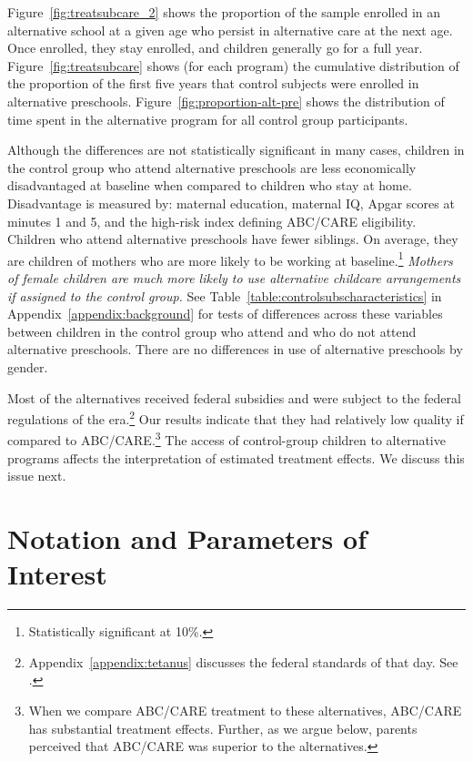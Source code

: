 Figure~\ref{fig:treatsubcare_2} shows the proportion of the sample enrolled in an alternative school at a given age who persist in alternative care at the next age. Once enrolled, they stay enrolled, and children generally go for a full year.  Figure~\ref{fig:treatsubcare} shows (for each program) the cumulative distribution of the proportion of the first five years that control subjects were enrolled in alternative preschools. Figure~\ref{fig:proportion-alt-pre} shows the distribution of time spent in the alternative program for all control group participants.

Although the differences are not statistically significant in many cases, children in the control group who attend alternative preschools are less economically disadvantaged at baseline when compared to children who stay at home. Disadvantage is measured by: maternal education, maternal IQ, Apgar scores at minutes 1 and 5, and the high-risk index defining ABC/CARE eligibility. Children who attend alternative preschools have fewer siblings. On average, they are children of mothers who are more likely to be working at baseline.\footnote{Statistically significant at 10\%.} \emph{Mothers of female children are much more likely to use alternative childcare arrangements if assigned to the control group.} See Table~\ref{table:controlsubscharacteristics} in Appendix~\ref{appendix:background} for tests of differences across these variables between children in the control group who attend and who do not attend alternative preschools. There are no differences in use of alternative preschools by gender.

Most of the alternatives received federal subsidies and were subject to the federal regulations of the era.\footnote{Appendix~\ref{appendix:tetanus} discusses the federal standards of that day. See \citet{Department-of-Health_1968_DayCareRequirements,NCGA_1971_House-Bill-100,Ramey-et-al_1977_Intro-to-ABC,Ramey_Campbell_1979_SR,Ramey_McGinness_etal_1982_Abecedarianapproach, Burchinal_Campbell_etal_1997_CD}.} Our results indicate that they had relatively low quality if compared to ABC/CARE.\footnote{When we compare ABC/CARE treatment to these alternatives, ABC/CARE has substantial treatment effects. Further, as we argue below, parents perceived that ABC/CARE was superior to the alternatives.} The access of control-group children to alternative programs affects the interpretation of estimated treatment effects. We discuss this issue next.

\section{Notation and Parameters of Interest} \label{section:methodsquestions}

